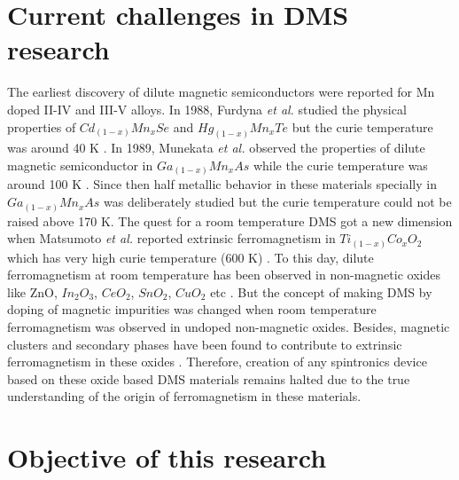 \documentclass[main.tex]{subfiles}
\begin{document}
\section{Current challenges in DMS research}

The earliest discovery of dilute magnetic semiconductors were reported for Mn doped II-IV and III-V alloys. In 1988, Furdyna \textit{et al.} studied the physical properties of $Cd_{(1-x)}Mn_{x}Se$ and $Hg_{(1-x)}Mn_{x}Te$ but the curie temperature was around 40 K \cite{furdyna1988diluted}. In 1989, Munekata \textit{et al.} observed the properties of dilute magnetic semiconductor in $Ga_{(1-x)}Mn_{x}As$ while the curie temperature was around 100 K \cite{munekata1989diluted}. Since then half metallic behavior in these materials specially in $Ga_{(1-x)}Mn_{x}As$ was deliberately studied but the curie temperature could not be raised above 170 K. The quest for a room temperature DMS got a new dimension when Matsumoto \textit{et al.} reported extrinsic ferromagnetism in $Ti_{(1-x)}Co_{x}O_{2}$ which has very high curie temperature (600 K) \cite{matsumoto2001room}. To this day, dilute ferromagnetism at room temperature has been observed in non-magnetic oxides like ZnO, $In_{2}O_{3}$, $CeO_{2}$, $SnO_{2}$, $CuO_{2}$ etc \cite{yi2010ferromagnetism, ueda2001magnetic, ogale2003high, philip2004high}. But the concept of making DMS by doping of magnetic impurities was changed when room temperature ferromagnetism was observed in undoped non-magnetic oxides. Besides, magnetic clusters and secondary phases have been found to contribute to extrinsic ferromagnetism in these oxides \cite{sundaresan2006ferromagnetism, hong2006room, venkatesan2004thin}. Therefore, creation of any spintronics device based on these oxide based DMS materials remains halted due to the true understanding of the origin of ferromagnetism in these materials. 

\section{Objective of this research}
\end{document}
